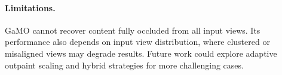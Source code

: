 \documentclass[runningheads]{llncs}
\begin{document}
\paragraph{Limitations.}
GaMO cannot recover content fully occluded from all input views. Its performance also depends on input view distribution, where clustered or misaligned views may degrade results. Future work could explore adaptive outpaint scaling and hybrid strategies for more challenging cases.









\end{document}
